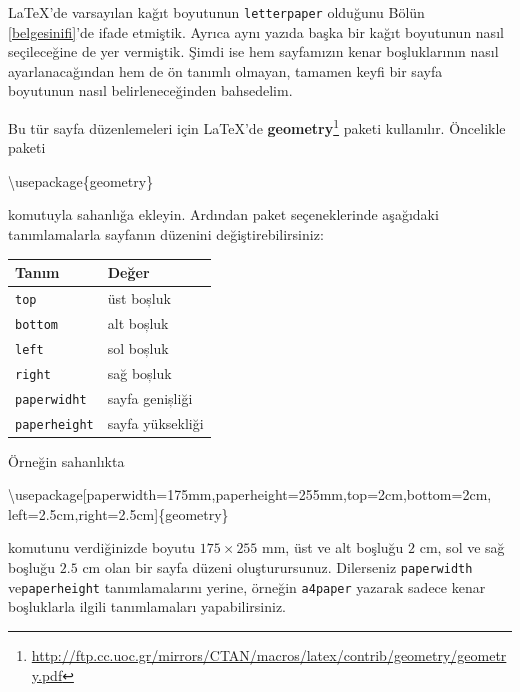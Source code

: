 \documentclass[
  10pt,
]{scrbook}
\newenvironment{Shaded}{\begin{snugshade}}{\end{snugshade}}
\newcommand{\BuiltInTok}[1]{#1}
\newcommand{\ExtensionTok}[1]{#1}
\newcommand{\NormalTok}[1]{#1}
\renewcommand{\href}[2]{#2\footnote{\url{#1}}}
\theoremstyle{definition}
\theoremstyle{definition}
\theoremstyle{definition}
\theoremstyle{definition}
\theoremstyle{remark}
\begin{document}
LaTeX'de varsayılan kağıt boyutunun \texttt{letterpaper} olduğunu Bölün \ref{belgesinifi}'de ifade etmiştik. Ayrıca aynı yazıda başka bir kağıt boyutunun nasıl seçileceğine de yer vermiştik. Şimdi ise hem sayfamızın kenar boşluklarının nasıl ayarlanacağından hem de ön tanımlı olmayan, tamamen keyfi bir sayfa boyutunun nasıl belirleneceğinden bahsedelim.

Bu tür sayfa düzenlemeleri için LaTeX'de \href{http://ftp.cc.uoc.gr/mirrors/CTAN/macros/latex/contrib/geometry/geometry.pdf}{\textbf{geometry}} paketi kullanılır. Öncelikle paketi

\begin{Shaded}
\begin{Highlighting}[]
\BuiltInTok{\textbackslash{}usepackage}\NormalTok{\{}\ExtensionTok{geometry}\NormalTok{\}}
\end{Highlighting}
\end{Shaded}

komutuyla sahanlığa ekleyin. Ardından paket seçeneklerinde aşağıdaki tanımlamalarla sayfanın düzenini değiştirebilirsiniz:

\begin{longtable}[]{@{}ll@{}}
\toprule
Tanım & Değer \\
\midrule
\endhead
\texttt{top} & üst boșluk \\
\texttt{bottom} & alt boșluk \\
\texttt{left} & sol boșluk \\
\texttt{right} & sağ boșluk \\
\texttt{paperwidht} & sayfa genișliği \\
\texttt{paperheight} & sayfa yüksekliği \\
\bottomrule
\end{longtable}

Örneğin sahanlıkta

\begin{Shaded}
\begin{Highlighting}[]
\BuiltInTok{\textbackslash{}usepackage}\NormalTok{[paperwidth=175mm,paperheight=255mm,top=2cm,bottom=2cm,}
\NormalTok{left=2.5cm,right=2.5cm]\{}\ExtensionTok{geometry}\NormalTok{\}}
\end{Highlighting}
\end{Shaded}

komutunu verdiğinizde boyutu \(175\times 255\) mm, üst ve alt boşluğu \(2\) cm, sol ve sağ boşluğu \(2.5\) cm olan bir sayfa düzeni oluşturursunuz. Dilerseniz \texttt{paperwidth} ve\texttt{paperheight} tanımlamalarını yerine, örneğin \texttt{a4paper} yazarak sadece kenar boşluklarla ilgili tanımlamaları yapabilirsiniz.
\end{document}

